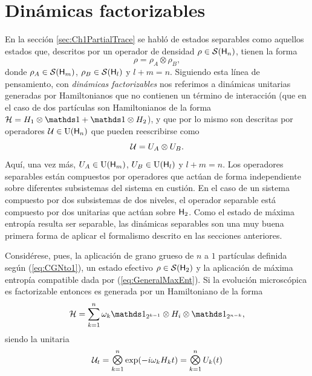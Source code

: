 \section{Dinámicas factorizables}

En la sección \ref{sec:Ch1PartialTrace} se habló de estados separables como aquellos estados que, descritos por un operador de densidad $\rho\in\mathcal{S}({\sf H}_{n})$, tienen la forma
\begin{equation*}
    \rho=\rho_{A}\otimes\rho_{B},
\end{equation*}
donde $\rho_{A}\in\mathcal{S}({\sf H}_{m})$, $\rho_{B}\in\mathcal{S}({\sf H}_{l})$ y $l+m=n$. Siguiendo esta línea de pensamiento, con \textit{dinámicas factorizables} nos referimos a dinámicas unitarias generadas por Hamiltonianos que no contienen un término de interacción (que en el caso de dos partículas son Hamiltonianos de la forma $\mcH=H_{1}\otimes\Id+\Id\otimes H_{2}$), y que por lo mismo son descritas por operadores $\mathcal{U}\in\text{U}({\sf H}_{n})$ que pueden reescribirse como
\begin{equation*}
    \mathcal{U}=U_{A}\otimes U_{B}.
\end{equation*}
Aquí, una vez más, $U_{A}\in\text{U}({\sf H}_{m})$, $U_{B}\in\text{U}({\sf H}_{l})$ y $l+m=n$. Los operadores separables están compuestos por operadores que actúan de forma independiente sobre diferentes subsistemas del sistema en custión. En el caso de un sistema compuesto por dos subsistemas de dos niveles, el operador separable está compuesto por dos unitarias que actúan sobre ${\sf H}_{2}$. Como el estado de máxima entropía resulta ser separable, las dinámicas separables son una muy buena primera forma de aplicar el formalismo descrito en las secciones anteriores.

Considérese, pues, la aplicación de grano grueso de $n$ a $1$ partículas definida según (\ref{eq:CGNto1}), un estado efectivo $\rho\in\mathcal{S}({\sf H}_{2})$ y la aplicación de máxima entropía compatible dada por (\ref{eq:GeneralMaxEnt}). Si la evolución microscópica es factorizable entonces es generada por un Hamiltoniano de la forma
\begin{equation*}
    \mcH=\sum_{k=1}^{n}\omega_{k}\Id_{2^{k-1}}\otimes H_{i} \otimes \Id_{2^{n-k}},
\end{equation*}
siendo la unitaria 
\begin{equation}\label{eq:NFactorUnitaries}
    \mcU_{t}=\Motimes_{k=1}^{n}\text{exp}\qty(-i\omega_{k}H_{k}t)=\Motimes_{k=1}^{n} U_{k}(t)
\end{equation}


